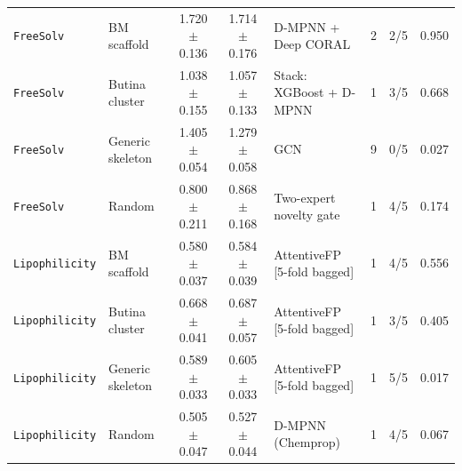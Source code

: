 \documentclass[11pt]{article}
\begin{document}
\begin{landscape}
{\begin{longtable}{llcclccc}
\texttt{FreeSolv} & BM scaffold & 1.720 $\pm$ 0.136 & 1.714 $\pm$ 0.176 & D-MPNN + Deep CORAL & 2 & 2/5 & 0.950 \\
\texttt{FreeSolv} & Butina cluster & 1.038 $\pm$ 0.155 & 1.057 $\pm$ 0.133 & Stack: XGBoost + D-MPNN & 1 & 3/5 & 0.668 \\
\texttt{FreeSolv} & Generic skeleton & 1.405 $\pm$ 0.054 & 1.279 $\pm$ 0.058 & GCN & 9 & 0/5 & 0.027 \\
\texttt{FreeSolv} & Random & 0.800 $\pm$ 0.211 & 0.868 $\pm$ 0.168 & Two-expert novelty gate & 1 & 4/5 & 0.174 \\
\texttt{Lipophilicity} & BM scaffold & 0.580 $\pm$ 0.037 & 0.584 $\pm$ 0.039 & AttentiveFP [5-fold bagged] & 1 & 4/5 & 0.556 \\
\texttt{Lipophilicity} & Butina cluster & 0.668 $\pm$ 0.041 & 0.687 $\pm$ 0.057 & AttentiveFP [5-fold bagged] & 1 & 3/5 & 0.405 \\
\texttt{Lipophilicity} & Generic skeleton & 0.589 $\pm$ 0.033 & 0.605 $\pm$ 0.033 & AttentiveFP [5-fold bagged] & 1 & 5/5 & 0.017 \\
\texttt{Lipophilicity} & Random & 0.505 $\pm$ 0.047 & 0.527 $\pm$ 0.044 & D-MPNN (Chemprop) & 1 & 4/5 & 0.067 \\
\bottomrule
\end{longtable}}
\end{landscape}
\end{document}
